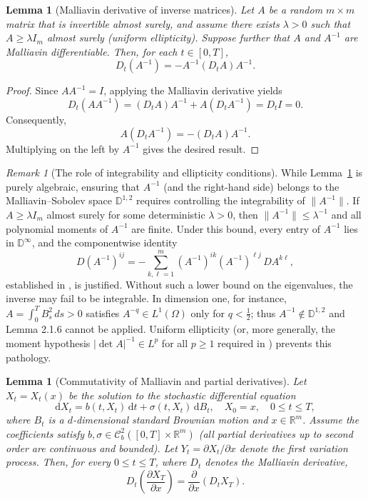 \documentclass[]{interact}
\newcommand{\1}{\mathbf{1}}
\theoremstyle{plain}%
\newtheorem{lemma}[theorem]{Lemma}
\theoremstyle{definition}
\theoremstyle{remark}
\newtheorem{remark}[theorem]{Remark}
\numberwithin{equation}{section}
\begin{document}
\begin{lemma}[Malliavin derivative of inverse matrices]
\label{lemma:D-of-A-inverse}
Let $A$ be a random $m \times m$ matrix that is invertible almost surely, and assume there exists $\lambda > 0$ such that $A \geq \lambda I_m$ almost surely (uniform ellipticity). Suppose further that $A$ and $A^{-1}$ are Malliavin differentiable. Then, for each $t \in [0,T]$,
\[
D_t(A^{-1}) = -A^{-1}(D_tA)A^{-1}.
\]
\end{lemma}

\begin{proof}
Since $AA^{-1} = I$, applying the Malliavin derivative yields
\[
D_t(AA^{-1}) = (D_tA)A^{-1} + A(D_tA^{-1}) = D_tI = 0.
\]
Consequently,
\[
A(D_tA^{-1}) = -(D_tA)A^{-1}.
\]
Multiplying on the left by $A^{-1}$ gives the desired result.

\end{proof}

\begin{remark}[The role of integrability and ellipticity conditions]
\label{rem:ellipticity-vs-moments}
While Lemma~\ref{lemma:D-of-A-inverse} is purely algebraic, ensuring that $A^{-1}$ (and the right-hand side) belongs to the Malliavin--Sobolev space $\mathbb{D}^{1,2}$ requires controlling the integrability of $\|A^{-1}\|$.
%
%
If $A \geq \lambda I_m$ almost surely for some deterministic $\lambda > 0$, then $\|A^{-1}\| \leq \lambda^{-1}$ and all polynomial moments of $A^{-1}$ are finite. Under this bound, every entry of $A^{-1}$ lies in $\mathbb{D}^\infty$, and the componentwise identity
\[
D(A^{-1})^{ij} = -\sum_{k,\ell=1}^{m}(A^{-1})^{ik}(A^{-1})^{\ell j}\,D A^{k\ell},
\]
established in \cite[Lemma 2.1.6]{nualart2006malliavin}, is justified.
%
Without such a lower bound on the eigenvalues, the inverse may fail to be integrable. In dimension one, for instance, $A = \int_0^{T}B_s^{2}\,ds > 0$ satisfies $A^{-q} \in L^{1}(\Omega)$ only for $q < \frac{1}{2}$; thus $A^{-1} \notin \mathbb{D}^{1,2}$ and Lemma 2.1.6 cannot be applied. Uniform ellipticity (or, more generally, the moment hypothesis $|\det A|^{-1} \in L^{p}$ for all $p \geq 1$ required in \cite[Lemma 2.1.6]{nualart2006malliavin}) prevents this pathology.
\end{remark}



\begin{lemma}[Commutativity of Malliavin and partial derivatives]
\label{lemma:commutativity-malliavin-partials}
Let $X_t = X_t(x)$ be the solution to the stochastic differential equation
\[
\mathrm{d}X_t = b(t,X_t)\,\mathrm{d}t + \sigma(t,X_t)\,\mathrm{d}B_t,
\quad X_0 = x, \quad 0 \leq t \leq T,
\]
where $B_t$ is a $d$-dimensional standard Brownian motion and $x \in \mathbb{R}^{m}$.
Assume the coefficients satisfy
$b, \sigma \in \mathcal{C}^{2}_{\!b}([0,T] \times \mathbb{R}^{m})$
(all partial derivatives up to second order are continuous and bounded).
Let $Y_t = \partial X_t/\partial x$ denote the first variation process.
Then, for every $0 \leq t \leq T$, where $D_t$ denotes the Malliavin derivative,
\[
D_t\left(\frac{\partial X_T}{\partial x}\right)
=
\frac{\partial}{\partial x}(D_t X_T).
\]
\end{lemma}
\end{document}
